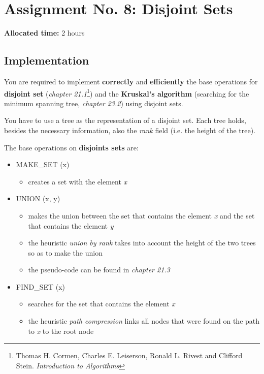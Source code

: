 \documentclass[../en-fa-lab.tex]{subfiles}
\begin{document}
\section{\texorpdfstring{\textbf{Assignment No. 8: Disjoint Sets}}{Assignment No. 8: Disjoint Sets}}\label{assign8}
\textbf{}

\textbf{Allocated time:} 2 hours

\subsection{Implementation}\label{implementation}

You are required to implement \textbf{correctly} and
\textbf{efficiently} the base operations for \textbf{disjoint set}
(\emph{chapter 21.1}\footnote{Thomas H. Cormen, Charles E. Leiserson,
  Ronald L. Rivest and Clifford Stein. \emph{Introduction to Algorithms}})
and the \textbf{Kruskal's algorithm} (searching for the minimum spanning
tree, \emph{chapter 23.2}\citep{cormen}) using disjoint sets.

You have to use a tree as the representation of a disjoint set. Each
tree holds, besides the necessary information, also the \emph{rank}
field (i.e. the height of the tree).

The base operations on \textbf{disjoints sets} are:

\begin{itemize}
\item
  MAKE\_SET (x)

  \begin{itemize}
  \item
    creates a set with the element \emph{x}
  \end{itemize}
\item
  UNION (x, y)

  \begin{itemize}
  \item
    makes the union between the set that contains the element \emph{x}
    and the set that contains the element \emph{y}
  \item
    the heuristic \emph{union by rank} takes into account the height of
    the two trees so as to make the union
  \item
    the pseudo-code can be found in \emph{chapter
    21.3}\citep{cormen}
  \end{itemize}
\item
  FIND\_SET (x)

  \begin{itemize}
  \item
    searches for the set that contains the element \emph{x}
  \item
    the heuristic \emph{path compression} links all nodes that were
    found on the path to \emph{x} to the root node
  \end{itemize}
\end{itemize}
\end{document}
